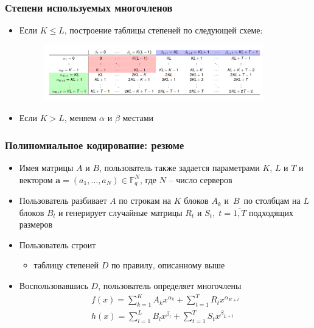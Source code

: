 \documentclass{beamer}
\let\vec\mathbf
\begin{document}
\begin{frame}
    \frametitle{Степени используемых многочленов}
    \begin{itemize}
        \item Если $K \leqslant L$, построение таблицы степеней по следующей схеме:
        \begin{figure}[]
            \centering
            \includegraphics[width=0.9\textwidth]{gasp.png}
        \end{figure}
        \item Если $K > L$, меняем $\alpha$ и $\beta$ местами
    \end{itemize}
\end{frame}

\begin{frame}
    \frametitle{Полиномиальное кодирование: резюме}
    \begin{itemize}
        \item<1-> Имея матрицы $A$ и $B$, пользователь также задается параметрами $K$, $L$ и $T$ и вектором $\vec{a} = \left(a_1, \dots, a_N\right) \in \mathbb{F}^N_q$, где $N$ -- число серверов
        \item<2-> Пользователь разбивает $A$ по строкам на $K$ блоков $A_k$ и~$B$~по столбцам на $L$ блоков $B_l$ и генерирует случайные матрицы $R_t$ и $S_t,\; t=\overline{1,T}$ подходящих размеров

        \item<3-> Пользователь строит 
        \begin{itemize}
            \item таблицу степеней $D$ по правилу, описанному выше
        \end{itemize}
        \item<4-> Воспользовавшись $D$, пользователь определяет многочлены 
        \begin{gather*}
            f(x) = \sum_{k=1}^K A_k x^{\alpha_k} + \sum_{t=1}^{T}R_t x^{\alpha_{K+t}} \\
            h(x) = \sum_{l=1}^L B_l x^{\beta_l} + \sum_{t=1}^{T}S_t x^{\beta_{L+t}}
        \end{gather*} 
    \end{itemize}
\end{frame}
\end{document}
